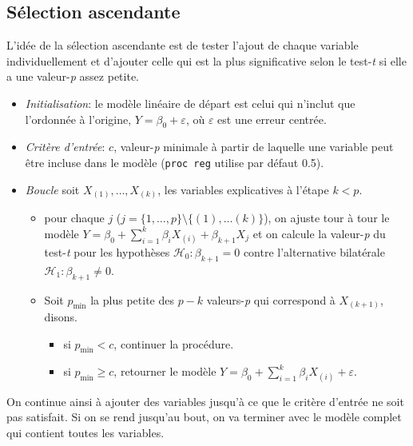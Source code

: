\documentclass[
  11pt,
  letterpaper,
]{book}
\providecommand{\tightlist}{%
  \setlength{\itemsep}{0pt}\setlength{\parskip}{0pt}}
\theoremstyle{definition}
\theoremstyle{definition}
\theoremstyle{definition}
\theoremstyle{remark}
\begin{document}
\hypertarget{suxe9lection-ascendante}{%
\subsection{Sélection ascendante}\label{suxe9lection-ascendante}}

L'idée de la sélection ascendante est de tester l'ajout de chaque variable individuellement et d'ajouter celle qui est la plus significative selon le test-\emph{t} si elle a une valeur-\emph{p} assez petite.

\begin{itemize}
\tightlist
\item
  \emph{Initialisation}: le modèle linéaire de départ est celui qui n'inclut que l'ordonnée à l'origine, \(Y=\beta_0+\varepsilon\), où \(\varepsilon\) est une erreur centrée.
\item
  \emph{Critère d'entrée}: \(c\), valeur-\emph{p} minimale à partir de laquelle une variable peut être incluse dans le modèle (\texttt{proc\ reg} utilise par défaut 0.5).
\item
  \emph{Boucle} soit \(X_{(1)}, \ldots, X_{(k)}\), les variables explicatives à l'étape \(k<p\).

  \begin{itemize}
  \tightlist
  \item
    pour chaque \(j\) (\(j=\{1,\ldots, p\}\setminus \{(1), \ldots (k)\}\)), on ajuste tour à tour le modèle \(Y=\beta_0+\sum_{i=1}^k \beta_i X_{(i)} + \beta_{k+1}X_{j}\) et on calcule la valeur-\emph{p} du test-\emph{t} pour les hypothèses \(\mathcal{H}_0: \beta_{k+1}=0\) contre l'alternative bilatérale \(\mathcal{H}_1: \beta_{k+1} \neq 0\).
  \item
    Soit \(p_{\min}\) la plus petite des \(p-k\) valeurs-\emph{p} qui correspond à \(X_{(k+1)}\), disons.

    \begin{itemize}
    \tightlist
    \item
      si \(p_{\min}<c\), continuer la procédure.
    \item
      si \(p_{\min} \geq c\), retourner le modèle \(Y=\beta_0 + \sum_{i=1}^k \beta_iX_{(i)}+\varepsilon\).
    \end{itemize}
  \end{itemize}
\end{itemize}

On continue ainsi à ajouter des variables jusqu'à ce que le critère d'entrée ne soit pas satisfait. Si on se rend jusqu'au bout, on va terminer avec le modèle complet qui contient toutes les variables.
\end{document}
